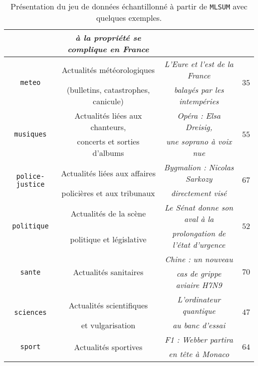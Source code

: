 \begin{table}[!htb]
\begin{center}
\begin{scriptsize}
\begin{tabular}{|c|c|c|c|}
					& \textit{à la propriété se complique en France}
					&
					\tabularnewline
					\hline
				\multirow{2}{*}{\texttt{meteo}}
					& Actualités météorologiques
					& \textit{L'Eure et l'est de la France}
					& \multirow{2}{*}{$35$}
					\tabularnewline
					& (bulletins, catastrophes, canicule)
					& \textit{balayés par les intempéries}
					&
					\tabularnewline
					\hline
				\multirow{2}{*}{\texttt{musiques}}
					& Actualités liées aux chanteurs,
					& \textit{Opéra : Elsa Dreisig,}
					& \multirow{2}{*}{$55$}
					\tabularnewline
					& concerts et sorties d'albums
					& \textit{une soprano à voix nue}
					&
					\tabularnewline
					\hline
				\multirow{2}{*}{\texttt{police-justice}}
					&Actualités liées aux affaires
					& \textit{Bygmalion : Nicolas Sarkozy}
					& \multirow{2}{*}{$67$}
					\tabularnewline
					& policières et aux tribunaux
					& \textit{directement visé}
					&
					\tabularnewline
					\hline
				\multirow{2}{*}{\texttt{politique}}
					& Actualités de la scène
					& \textit{Le Sénat donne son aval à la}
					& \multirow{2}{*}{$52$}
					\tabularnewline
					& politique et législative
					& \textit{prolongation de l'état d'urgence}
					&
					\tabularnewline
					\hline
				\multirow{2}{*}{\texttt{sante}}
					& \multirow{2}{*}{Actualités sanitaires}
					& \textit{Chine : un nouveau}
					& \multirow{2}{*}{$70$}
					\tabularnewline
					&
					& \textit{cas de grippe aviaire H7N9}
					&
					\tabularnewline
					\hline
				\multirow{2}{*}{\texttt{sciences}}
					& Actualités scientifiques
					& \textit{L'ordinateur quantique}
					& \multirow{2}{*}{$47$}
					\tabularnewline
					& et vulgarisation
					& \textit{au banc d'essai}
					&
					\tabularnewline
					\hline
				\multirow{2}{*}{\texttt{sport}}
					& \multirow{2}{*}{Actualités sportives}
					& \textit{F1 : Webber partira}
					& \multirow{2}{*}{$64$}
					\tabularnewline
					&
					& \textit{en tête à Monaco}
					&
					\tabularnewline
					\hline
			\end{tabular}
			\end{scriptsize}
			\end{center}
			\caption{
				Présentation du jeu de données échantillonné à partir de \texttt{MLSUM} avec quelques exemples.
			}
			\label{table:A.2-DATASET-MLSUM-SUBSET-SCHILD}
		\end{table}
		
